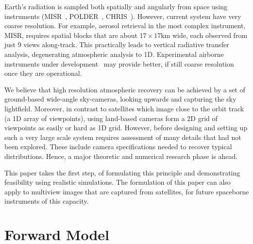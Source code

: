 \documentclass[10pt,twocolumn,letterpaper]{article}
\begin{document}
Earth's radiation is sampled both spatially and angularly from space using instruments (MISR~\cite{diner,matronchik}, POLDER~\cite{breon}, CHRIS~\cite{vanMol}). However, current system have very coarse resolution. For example, aerosol retrieval in the most complex instrument, MISR, requires spatial blocks that are about $17\times 17$km wide, each observed from just 9 views along-track. This practically leads to vertical radiative transfer analysis, degenerating atmospheric analysis to 1D. Experimental airborne instruments under development~\cite{baxter,dinerDavis10} may provide better, if still coarse resolution once they are operational.

We believe that high resolution atmospheric recovery can be achieved by a set of ground-based wide-angle sky-cameras, looking upwards and capturing the sky lightfield. Moreover, in contrast to satellites which image close to the orbit track (a 1D array of viewpoints), using land-based cameras form a 2D grid of viewpoints as easily or hard as 1D grid. However, before designing and setting up such a very large scale system requires assessment of many details that had not been explored. These include camera specifications needed to recover typical distributions. Hence, a major theoretic and numerical research phase is ahead.

This paper takes the first step, of formulating this principle and demonstrating feasibility using realistic simulations. The formulation of this paper can also apply to multiview images that are captured from satellites, for future spaceborne instruments of this capacity.



\section{Forward Model}
\label{sec:skymodel} \vspace{-0.2cm}
\end{document}
